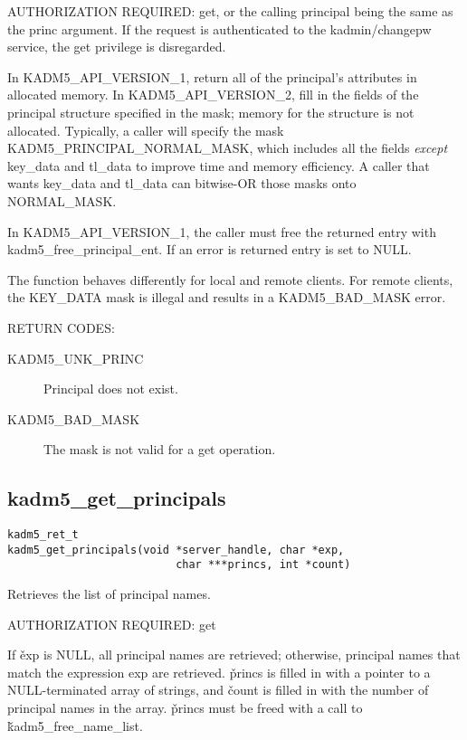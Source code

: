 AUTHORIZATION REQUIRED: get, or the calling principal being the same
as the princ argument.  If the request is authenticated to the
kadmin/changepw service, the get privilege is disregarded.

In KADM5_API_VERSION_1, return all of the principal's attributes in
allocated memory.  In KADM5_API_VERSION_2, fill in the fields of the
principal structure specified in the mask; memory for the structure is
not allocated.  Typically, a caller will specify the mask
KADM5_PRINCIPAL_NORMAL_MASK, which includes all the fields {\it
except} key_data and tl_data to improve time and memory efficiency.  A
caller that wants key_data and tl_data can bitwise-OR those masks onto
NORMAL_MASK.  

In KADM5_API_VERSION_1, the caller must free the returned entry with
kadm5_free_principal_ent.  If an error is returned entry is set to
NULL.

The function behaves differently for local and remote clients.  For
remote clients, the KEY_DATA mask is illegal and results in a
KADM5_BAD_MASK error.

RETURN CODES:

\begin{description}
\item[KADM5_UNK_PRINC] Principal does not exist.
\item[KADM5_BAD_MASK] The mask is not valid for a get operation.

\end{description}

\subsection{kadm5_get_principals}

\begin{verbatim}
kadm5_ret_t
kadm5_get_principals(void *server_handle, char *exp,
                          char ***princs, int *count)
\end{verbatim}

Retrieves the list of principal names.  

AUTHORIZATION REQUIRED: get

If \v{exp} is NULL, all principal names are retrieved; otherwise,
principal names that match the expression exp are retrieved.
\v{princs} is filled in with a pointer to a NULL-terminated array of
strings, and \v{count} is filled in with the number of principal names
in the array.  \v{princs} must be freed with a call to
\v{kadm5_free_name_list}.

